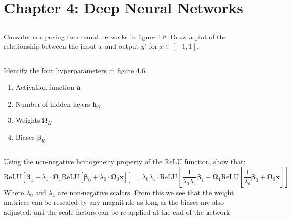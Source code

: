 \documentclass[12pt]{report}
\begin{document}
\section*{Chapter 4: Deep Neural Networks}

\subsection{}
\begin{mdframed}
    Consider composing two neural networks in figure 4.8. Draw a plot of the relationship between the input $x$ and output $y'$ for $x \in [-1,1]$.
\end{mdframed}
\subsection{}

\begin{mdframed}
    Identify the four hyperparameters in figure 4.6.
\end{mdframed}

\begin{enumerate}
    \item Activation function $\mathbf{a}$
    \item Number of hidden layers $\mathbf{h}_{K}$
    \item Weights $\boldsymbol{\Omega}_{K}$
    \item Biases $\boldsymbol{\beta}_{K}$
\end{enumerate}

\subsection{}
\begin{mdframed}
    Using the non-negative homogeneity property of the $\text{ReLU}$ function, show that:
    \begin{equation*}
        \text{ReLU}\left[\boldsymbol{\beta}_{1} + \lambda_{1}\cdot\boldsymbol{\Omega}_{1}\text{ReLU}\left[\boldsymbol{\beta}_{0} +\lambda_{0}\cdot\boldsymbol{\Omega}_{0}\mathbf{x}\right]\right]
        = \lambda_{0}\lambda_{1}\cdot\text{ReLU}
        \left[\frac{1}{\lambda_{0}\lambda_{1}}\boldsymbol{\beta}_{1} + \boldsymbol{\Omega}_{1}\text{ReLU}\left[\frac{1}{\lambda_{0}}\boldsymbol{\beta}_{0}+\boldsymbol{\Omega}_{0}\mathbf{x}\right]\right]
    \end{equation*}
    Where $\lambda_{0}$ and $\lambda_{1}$ are non-negative scalars. From this we see that the weight matrices can be rescaled by any magnitude as long as the biases are also adjusted, and the scale factors can be re-applied at the end of the network
\end{mdframed}
\end{document}
